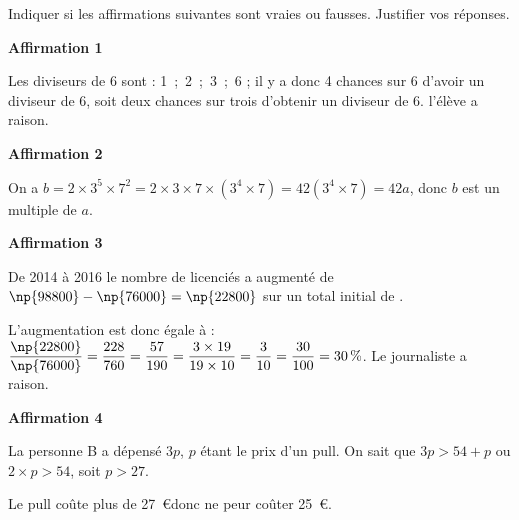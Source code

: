 
\medskip

Indiquer si les affirmations suivantes sont vraies ou fausses. Justifier vos réponses.

\medskip

\textbf{Affirmation 1}

\smallskip



Les diviseurs de 6 sont : 1~;~2~;~3~;~6 ; il y a donc 4 chances sur 6 d'avoir un diviseur de 6, soit deux chances sur trois d'obtenir un diviseur de 6. l'élève a raison.
\medskip

\textbf{Affirmation 2}

\smallskip



On a $b = 2 \times 3^5 \times 7^2  = 2 \times 3 \times 7 \times \left(3^4 \times 7 \right) = 42\left(3^4 \times 7 \right) = 42a $, donc $b$ est un multiple de $a$.

\medskip

\textbf{Affirmation 3}

\smallskip



De 2014 à 2016 le nombre de licenciés a augmenté de $\np{98800} - \np{76000} = \np{22800}$ sur un total initial de .

L'augmentation est donc  égale à : $\dfrac{\np{22800}}{\np{76000}} = \dfrac{228}{760} = \dfrac{57}{190} = \dfrac{3 \times 19}{19 \times 10} = \dfrac{3}{10}  = \dfrac{30}{100} = 30\,\%$. Le journaliste a raison.
\medskip

\textbf{Affirmation 4}

\smallskip

%
%
%
La personne B a dépensé $3p$, $p$ étant le prix d'un pull. On sait que $3p > 54 + p$ ou $2 \times p > 54$, soit $p > 27$.

Le pull coûte plus de 27~\euro donc ne peur coûter 25~\euro.
\bigskip

